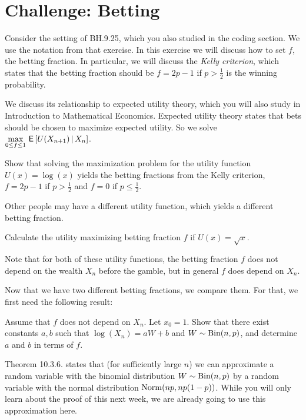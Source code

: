 \section{Challenge: Betting}
\label{sec:betting}

Consider the setting of BH.9.25, which you also studied in the coding section. We use the notation from that exercise.
In this exercise we will discuss how to set $f$, the betting fraction. In particular, we will discuss the \textit{Kelly criterion}, which states that the betting fraction should be $f = 2p-1$ if $p > \tfrac12$ is the winning probability.

We discuss its relationship to expected utility theory, which you will also study in Introduction to Mathematical Economics. Expected utility theory states that bets should be chosen to maximize expected utility. So we solve $\max\limits_{0 \leq f \leq 1} \,\mathsf{E}\left[U(X_{n+1}) \,\middle|\, X_n\right]$.



\begin{exercise}
Show that solving the maximization problem for the utility function $U(x) = \log(x)$ yields the betting fractions from the Kelly criterion, $f = 2p-1$ if $p > \tfrac12$ and $f=0$ if $p \leq \tfrac12$.
\end{exercise}

Other people may have a different utility function, which yields a different betting fraction.

\begin{exercise}
Calculate the utility maximizing betting fraction $f$ if $U(x) = \sqrt{x}$.
\end{exercise}

Note that for both of these utility functions, the betting fraction $f$ does not depend on the wealth $X_n$ before the gamble, but in general $f$ does depend on $X_n$.

Now that we have two different betting fractions, we compare them. For that, we first need the following result:

\begin{exercise}
Assume that $f$ does not depend on $X_n$. Let $x_0 = 1$. Show that there exist constants $a, b$ such that $\log (X_n) = a W + b$ and $W  \sim \mathrm{Bin}(n, p)$, and determine $a$ and $b$ in terms of $f$.
\end{exercise}

Theorem 10.3.6. states that (for sufficiently large $n$) we can approximate a random variable with the binomial distribution $W  \sim \mathrm{Bin}(n, p)$ by a random variable with the normal distribution $\mathrm{Norm}(np, np(1-p))$. While you will only learn about the proof of this next week, we are already going to use this approximation here.

